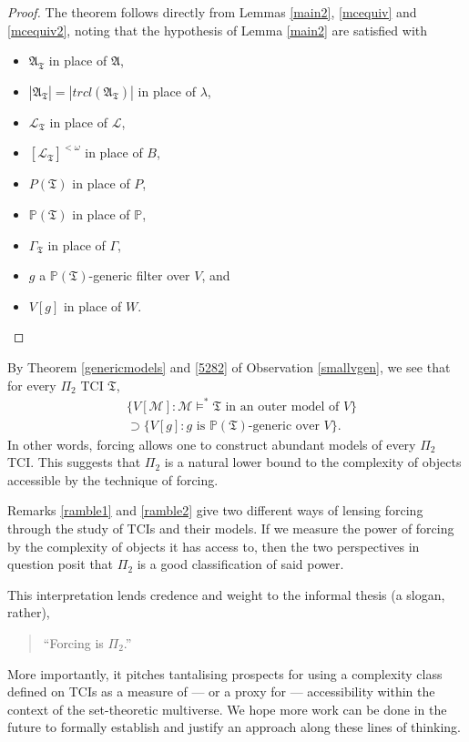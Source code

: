 \documentclass[12pt]{article}
\numberwithin{equation}{section}
\begin{document}
\begin{proof}
The theorem follows directly from Lemmas \ref{main2}, \ref{mcequiv} and \ref{mcequiv2}, noting that the hypothesis of Lemma \ref{main2} are satisfied with
\begin{itemize}
    \item $\mathfrak{A}_{\mathfrak{T}}$ in place of $\mathfrak{A}$,
    \item $|\mathfrak{A}_{\mathfrak{T}}| = |trcl(\mathfrak{A}_{\mathfrak{T}})|$ in place of $\lambda$,
    \item $\mathcal{L}_{\mathfrak{T}}$ in place of $\mathcal{L}$,
    \item $[\mathcal{L}_{\mathfrak{T}}]^{< \omega}$ in place of $B$,
    \item $P(\mathfrak{T})$ in place of $P$,
    \item $\mathbb{P}(\mathfrak{T})$ in place of $\mathbb{P}$, 
    \item $\Gamma_{\mathfrak{T}}$ in place of $\Gamma$,
    \item $g$ a $\mathbb{P}(\mathfrak{T})$-generic filter over $V$, and
    \item $V[g]$ in place of $W$. \qedhere
\end{itemize}
\end{proof}

\begin{rem}\label{ramble2}
By Theorem \ref{genericmodels} and \ref{5282} of Observation \ref{smallvgen}, we see that for every $\Pi_2$ TCI $\mathfrak{T}$,
\begin{align*}
    & \{V[\mathcal{M}] : \mathcal{M} \models^* \mathfrak{T} \text{ in an outer model of } V\} \\
    & \supset \{V[g] : g \text{ is } \mathbb{P}(\mathfrak{T}) \text{-generic over } V\} \text{.}
\end{align*}
In other words, forcing allows one to construct abundant models of every $\Pi_2$ TCI. This suggests that $\Pi_2$ is a natural lower bound to the complexity of objects accessible by the technique of forcing.
\end{rem}

Remarks \ref{ramble1} and \ref{ramble2} give two different ways of lensing forcing through the study of TCIs and their models. If we measure the power of forcing by the complexity of objects it has access to, then the two perspectives in question posit that $\Pi_2$ is a good classification of said power.  

This interpretation lends credence and weight to the informal thesis (a slogan, rather), 
\begin{quote}
    \centering
    ``Forcing is $\Pi_2$.''
\end{quote}
More importantly, it pitches tantalising prospects for using a complexity class defined on TCIs as a measure of --- or a proxy for --- accessibility within the context of the set-theoretic multiverse. We hope more work can be done in the future to formally establish and justify an approach along these lines of thinking.
\end{document}
